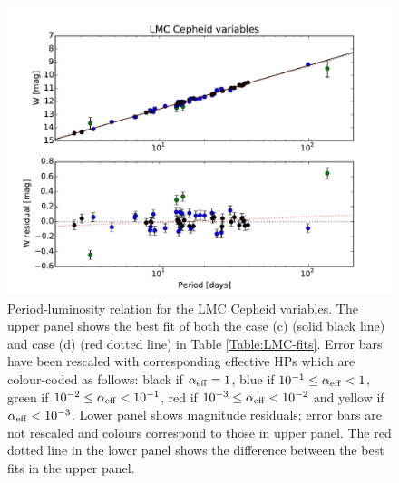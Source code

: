 \begin{figure}[tbp]
\centering %
\includegraphics[width=\textwidth]{figures/chapter-h0/effective_HP_cepheids_LMC.pdf} 
\caption{Period-luminosity relation for the LMC Cepheid variables. The upper panel shows the best fit of both the case (c) (solid black line) and case (d) (red dotted line) in Table \ref{Table:LMC-fits}. Error bars have been rescaled with corresponding effective HPs which are colour-coded as follows: black if $\alpha_{\mathrm{eff}} = 1$, blue if $10^{-1}\leq \alpha_{\mathrm{eff}} < 1$, green if $10^{-2}\leq \alpha_{\mathrm{eff}} < 10^{-1}$, red if  $10^{-3} \leq \alpha_{\mathrm{eff}} < 10^{-2}$ and yellow if $\alpha_{\mathrm{eff}} < 10^{-3}$. Lower panel shows magnitude residuals; error bars are not rescaled and colours correspond to those in upper panel. The red dotted line in the lower panel shows the difference between the best fits in the upper panel.}
\label{Fig:LMC-Cepheid-variables-fit-c}
\end{figure}

